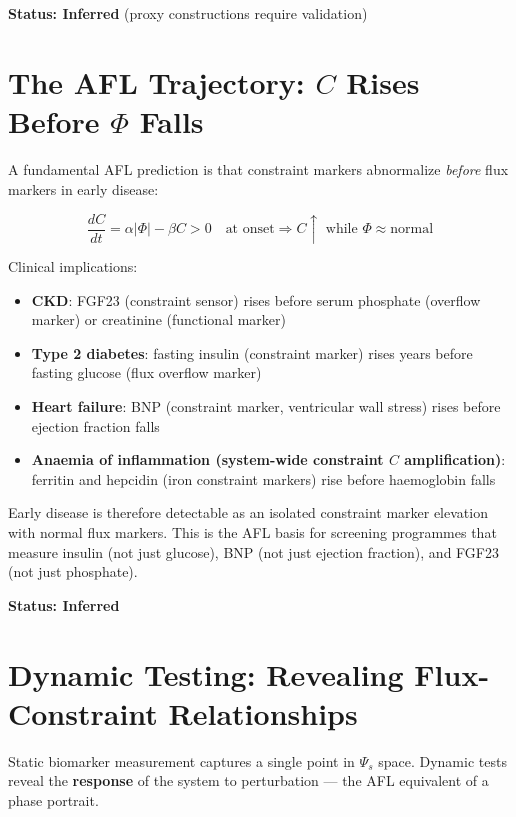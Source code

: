 \documentclass[12pt,a4paper]{article}
\begin{document}
\textbf{Status: Inferred} (proxy constructions require validation)

\section{The AFL Trajectory: $C$ Rises Before $\Phi$ Falls}

A fundamental AFL prediction is that constraint markers abnormalize \textit{before} flux markers in early disease:

\begin{equation}
    \frac{dC}{dt} = \alpha |\Phi| - \beta C > 0 \quad \text{at onset} \Rightarrow C \uparrow \text{ while } \Phi \approx \text{normal}
\end{equation}

Clinical implications:
\begin{itemize}
    \item \textbf{CKD}: FGF23 (constraint sensor) rises before serum phosphate (overflow marker) or creatinine (functional marker)
    \item \textbf{Type 2 diabetes}: fasting insulin (constraint marker) rises years before fasting glucose (flux overflow marker)
    \item \textbf{Heart failure}: BNP (constraint marker, ventricular wall stress) rises before ejection fraction falls
    \item \textbf{Anaemia of inflammation (system-wide constraint $C$ amplification)}: ferritin and hepcidin (iron constraint markers) rise before haemoglobin falls
\end{itemize}

Early disease is therefore detectable as an isolated constraint marker elevation with normal flux markers. This is the AFL basis for screening programmes that measure insulin (not just glucose), BNP (not just ejection fraction), and FGF23 (not just phosphate).

\textbf{Status: Inferred}

\section{Dynamic Testing: Revealing Flux-Constraint Relationships}

Static biomarker measurement captures a single point in $\Psi_s$ space. Dynamic tests reveal the \textbf{response} of the system to perturbation --- the AFL equivalent of a phase portrait.
\end{document}
